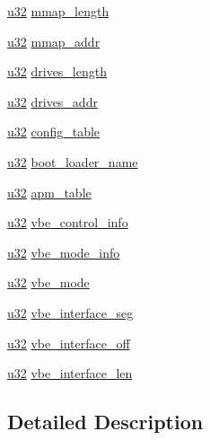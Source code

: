 \begin{DoxyCompactItemize}
\item 
\hyperlink{types_8h_a10e94b422ef0c20dcdec20d31a1f5049}{u32} \hyperlink{structmultiboot_a777be6ba5e5eb725abe899dfc2aa5b62}{mmap\-\_\-length}
\item 
\hyperlink{types_8h_a10e94b422ef0c20dcdec20d31a1f5049}{u32} \hyperlink{structmultiboot_ac70f33ae46b06b6aeea2754e4e6f7b04}{mmap\-\_\-addr}
\item 
\hyperlink{types_8h_a10e94b422ef0c20dcdec20d31a1f5049}{u32} \hyperlink{structmultiboot_ac4ed667a59de48634e82f06becff8b50}{drives\-\_\-length}
\item 
\hyperlink{types_8h_a10e94b422ef0c20dcdec20d31a1f5049}{u32} \hyperlink{structmultiboot_ace53c2abbb16b1883be941f3147a0a1a}{drives\-\_\-addr}
\item 
\hyperlink{types_8h_a10e94b422ef0c20dcdec20d31a1f5049}{u32} \hyperlink{structmultiboot_af6f16dad5291bd882d56902a60e799c2}{config\-\_\-table}
\item 
\hyperlink{types_8h_a10e94b422ef0c20dcdec20d31a1f5049}{u32} \hyperlink{structmultiboot_a704fd81b1fd6ce2dbe7ad8ba988e0bcc}{boot\-\_\-loader\-\_\-name}
\item 
\hyperlink{types_8h_a10e94b422ef0c20dcdec20d31a1f5049}{u32} \hyperlink{structmultiboot_a311fadc6cf55014adab6d4ac4f78b96b}{apm\-\_\-table}
\item 
\hyperlink{types_8h_a10e94b422ef0c20dcdec20d31a1f5049}{u32} \hyperlink{structmultiboot_a477fcc5846931e0d2730cc9c269c04c9}{vbe\-\_\-control\-\_\-info}
\item 
\hyperlink{types_8h_a10e94b422ef0c20dcdec20d31a1f5049}{u32} \hyperlink{structmultiboot_a58ad75a9d9fd3c24eb6950c2044291b3}{vbe\-\_\-mode\-\_\-info}
\item 
\hyperlink{types_8h_a10e94b422ef0c20dcdec20d31a1f5049}{u32} \hyperlink{structmultiboot_ac7cfbb437ea598de2cf5b7d6c9d00a43}{vbe\-\_\-mode}
\item 
\hyperlink{types_8h_a10e94b422ef0c20dcdec20d31a1f5049}{u32} \hyperlink{structmultiboot_afea093067e53f8a3b96cc90fae5907e9}{vbe\-\_\-interface\-\_\-seg}
\item 
\hyperlink{types_8h_a10e94b422ef0c20dcdec20d31a1f5049}{u32} \hyperlink{structmultiboot_ac303063ff863962ae4f670e16b7a07e5}{vbe\-\_\-interface\-\_\-off}
\item 
\hyperlink{types_8h_a10e94b422ef0c20dcdec20d31a1f5049}{u32} \hyperlink{structmultiboot_ac81c753152ce5392f591d5dbc124e87f}{vbe\-\_\-interface\-\_\-len}
\end{DoxyCompactItemize}


\subsection{Detailed Description}


